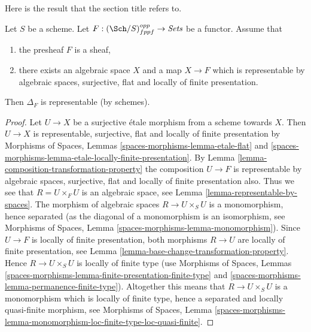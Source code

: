\noindent
Here is the result that the section title refers to.

\begin{lemma}
\label{lemma-bootstrap-diagonal}
Let $S$ be a scheme.
Let $F : (\Sch/S)_{fppf}^{opp} \to \textit{Sets}$ be a functor.
Assume that
\begin{enumerate}
\item the presheaf $F$ is a sheaf,
\item there exists an algebraic space $X$ and a map $X \to F$
which is representable by algebraic spaces, surjective, flat and
locally of finite presentation.
\end{enumerate}
Then $\Delta_F$ is representable (by schemes).
\end{lemma}

\begin{proof}
Let $U \to X$ be a surjective \'etale morphism from a scheme towards $X$.
Then $U \to X$ is representable, surjective, flat and
locally of finite presentation by
Morphisms of Spaces,
Lemmas \ref{spaces-morphisms-lemma-etale-flat} and
\ref{spaces-morphisms-lemma-etale-locally-finite-presentation}.
By
Lemma \ref{lemma-composition-transformation-property}
the composition $U \to F$ is representable by algebraic spaces,
surjective, flat and locally of finite presentation also.
Thus we see that $R = U \times_F U$ is an algebraic space, see
Lemma \ref{lemma-representable-by-spaces}.
The morphism of algebraic spaces $R \to U \times_S U$ is
a monomorphism, hence separated (as the diagonal of a monomorphism
is an isomorphism, see
Morphisms of Spaces,
Lemma \ref{spaces-morphisms-lemma-monomorphism}).
Since $U \to F$ is locally of finite presentation, both
morphisms $R \to U$ are locally of finite presentation, see
Lemma \ref{lemma-base-change-transformation-property}.
Hence $R \to U \times_S U$ is locally of finite type (use
Morphisms of Spaces,
Lemmas \ref{spaces-morphisms-lemma-finite-presentation-finite-type} and
\ref{spaces-morphisms-lemma-permanence-finite-type}).
Altogether this means that
$R \to U \times_S U$ is a monomorphism which is locally of finite
type, hence a separated and locally quasi-finite morphism, see
Morphisms of Spaces, Lemma
\ref{spaces-morphisms-lemma-monomorphism-loc-finite-type-loc-quasi-finite}.


\end{proof}
